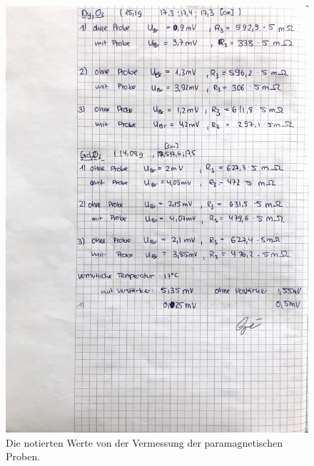 \begin{figure}
    \centering
    \includegraphics[width=\textwidth]{content/datenmessung.pdf}
    \caption{Die notierten Werte von der Vermessung der paramagnetischen Proben.}
    \label{fig:datenmessung}
\end{figure}
